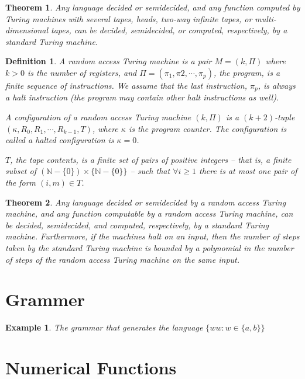 \documentclass[aps,pra,onecolumn,notitlepage,superscriptaddress]{revtex4-1}
\newcommand{\N}{\mathbb{N}}
\newtheorem{theo}{Theorem}
\newtheorem{defi}{Definition}
\newtheorem{exa}{Example}
\begin{document}
    \begin{theo}
        Any language decided or semidecided, and any function computed by Turing machines with several tapes, heads, two-way infinite tapes, or multi-dimensional tapes, can be decided, semidecided, or computed, respectively, by a standard Turing machine.
    \end{theo}

    \begin{defi}
        A random access Turing machine is a pair $M = (k, \Pi)$ where $k > 0$ is the number of registers, and $\Pi = (\pi_1, \pi2, \cdots ,\pi_p)$, the program, is a finite sequence of instructions. We assume that the last instruction, $\pi_p$, is always a halt instruction (the program may contain other halt instructions as well).

        A configuration of a random access Turing machine $(k, \Pi)$ is a $(k+2)$-tuple $(\kappa, R_0, R_1, \cdots, R_{k-1}, T)$, where $\kappa$ is the program counter. The configuration is called a halted configuration is $\kappa = 0$.

        $T$, the tape contents, is a finite set of pairs of positive integers -- that is, a finite subset of $(\N - \{ 0 \}) \times \{ \N - \{ 0 \} \}$ -- such that $\forall i \geq 1$ there is at most one pair of the form $(i,m) \in T$.
    \end{defi}

    \begin{theo}
        Any language decided or semidecided by a random access Turing machine, and any function computable by a random access Turing machine, can be decided, semidecided, and computed, respectively, by a standard Turing machine. Furthermore, if the machines halt on an input, then the number of steps taken by the standard Turing machine is bounded by a polynomial in the number of steps of the random access Turing machine on the same input.
    \end{theo}

    \section{Grammer}

    \begin{exa}
        The grammar that generates the language $\{ ww : w \in \{ a,b \} \}$
    \end{exa}

    \section{Numerical Functions}
\end{document}
